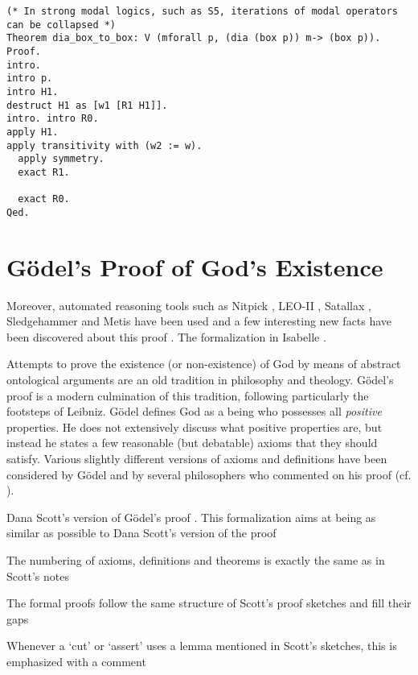 \documentclass{llncs}
\begin{document}
\begin{verbatim}
(* In strong modal logics, such as S5, iterations of modal operators can be collapsed *)
Theorem dia_box_to_box: V (mforall p, (dia (box p)) m-> (box p)).
Proof.
intro.
intro p.
intro H1.
destruct H1 as [w1 [R1 H1]].
intro. intro R0.
apply H1.
apply transitivity with (w2 := w).
  apply symmetry.
  exact R1.

  exact R0.
Qed.
\end{verbatim}


\section{G\"odel's Proof of God's Existence}
\label{sec:proof}

Moreover, automated reasoning tools such as Nitpick \cite{Nitpick}, LEO-II \cite{LEO-II}, Satallax \cite{Satallax}, Sledgehammer \cite{Sledgehammer} and Metis \cite{Hurd03first-orderproof} have been used and a few interesting new facts have been discovered about this proof \cite{TodO:ArXiv or Journal abstract}. The formalization in Isabelle \cite{ToDo:ArchiveFormalProofs}.

Attempts to prove the existence (or non-existence) of God by means of
abstract ontological arguments are an old tradition in philosophy and
theology.  G\"{o}del's proof \cite{Goedel1970,GoedelNotes} is a modern culmination of
this tradition, following particularly the footsteps of Leibniz.
%
G\"{o}del defines God as a being who possesses all \emph{positive} properties.
He does not extensively discuss what positive properties are, 
but instead he states a few reasonable (but debatable) axioms that they should satisfy.
Various slightly different versions of axioms and definitions have
been considered by G\"{o}del and by several philosophers who commented
on his proof
(cf. \cite{sobel2004logic,AndersonGettings,Fitting,Adams,ContemporaryBibliography}). 

Dana Scott's version of G\"odel's proof \cite{ScottNotes}. This formalization aims at
being as similar as possible to Dana Scott's version of the proof 

The numbering of axioms, definitions and theorems is exactly the same as in Scott's notes

The formal proofs follow the same structure of Scott's proof sketches and fill their gaps

Whenever a `cut' or `assert' uses a lemma mentioned in Scott's sketches,
this is emphasized with a comment 
\end{document}
